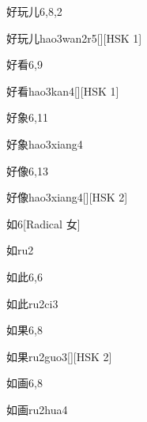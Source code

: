 \begin{entry}{好玩儿}{6,8,2}
  \begin{phonetics}{好玩儿}{hao3wan2r5}[][HSK 1]
  \end{phonetics}
\end{entry}

\begin{entry}{好看}{6,9}
  \begin{phonetics}{好看}{hao3kan4}[][HSK 1]
  \end{phonetics}
\end{entry}

\begin{entry}{好象}{6,11}
  \begin{phonetics}{好象}{hao3xiang4}
  \end{phonetics}
\end{entry}

\begin{entry}{好像}{6,13}
  \begin{phonetics}{好像}{hao3xiang4}[][HSK 2]
  \end{phonetics}
\end{entry}

\begin{entry}{如}{6}[Radical 女]
  \begin{phonetics}{如}{ru2}
  \end{phonetics}
\end{entry}

\begin{entry}{如此}{6,6}
  \begin{phonetics}{如此}{ru2ci3}
  \end{phonetics}
\end{entry}

\begin{entry}{如果}{6,8}
  \begin{phonetics}{如果}{ru2guo3}[][HSK 2]
  \end{phonetics}
\end{entry}

\begin{entry}{如画}{6,8}
  \begin{phonetics}{如画}{ru2hua4}
  \end{phonetics}
\end{entry}

